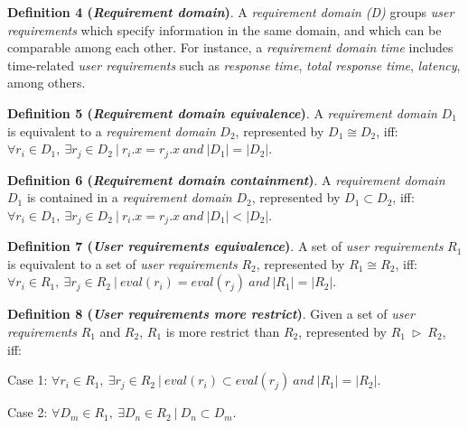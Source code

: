 \bigskip
\noindent \textbf{Definition 4 (\textsl{Requirement domain})}. A \textsl{requirement domain (D)} groups \textsl{user requirements} which specify information in the same domain, and which can be comparable among each other. For instance, a \textsl{requirement domain} \textit{time} includes time-related \textsl{user requirements} such as \textsl{response time}, \textsl{total response time}, \textsl{latency}, among others.

\bigskip
\noindent \textbf{Definition 5 (\textsl{Requirement domain equivalence})}. A \textsl{requirement domain} $D_{1}$ is equivalent to a \textsl{requirement domain} $D_{2}$, represented by $D_{1} \cong D_{2}$, iff: $\forall r_{i} \in D_{1}, \ \exists r_{j} \in D_{2} \ \vert \ r_{i}.x = r_{j}.x \ and \ \vert D_{1} \vert = \vert D_{2} \vert$.

\bigskip
\noindent \textbf{Definition 6 (\textsl{Requirement domain containment})}. A \textsl{requirement domain} $D_{1}$ is contained in a \textsl{requirement domain} $D_{2}$, represented by $D_{1} \subset D_{2}$, iff: $\forall r_{i} \in D_{1}, \ \exists r_{j} \in D_{2} \ \vert \ r_{i}.x = r_{j}.x \ and \ \vert D_{1} \vert < \vert D_{2} \vert$.

\bigskip
\noindent \textbf{Definition 7 (\textsl{User requirements equivalence})}.
A set of \textsl{user requirements} $R_{1}$ is equivalent to a set of \textsl{user requirements} $R_{2}$, represented by $R_{1} \cong R_{2}$, iff: $\forall r_{i} \in R_{1}, \ \exists r_{j} \in R_{2} \ \vert \ eval (r_{i}) = eval(r_{j}) \ and \ \vert R_{1} \vert = \vert R_{2} \vert$.

\bigskip
\noindent \textbf{Definition 8 (\textsl{User requirements more restrict})}.
Given a set of \textsl{user requirements} $R_{1}$ and $R_{2}$, $R_{1}$ is more restrict than $R_{2}$, represented by $R_{1} \ \rhd \ R_{2}$, iff:
\begin{flushleft}
Case 1: $\forall r_{i} \in R_{1}, \ \exists r_{j} \in R_{2} \ \vert \ eval (r_{i}) \subset eval(r_{j}) \ and \ \vert R_{1} \vert = \vert R_{2} \vert$.
\end{flushleft}
\begin{flushleft}
Case 2: $\forall D_{m} \in R_{1}, \ \exists D_{n} \in R_{2} \ \vert \ D_{n} \subset D_{m}$. \\
\end{flushleft}

